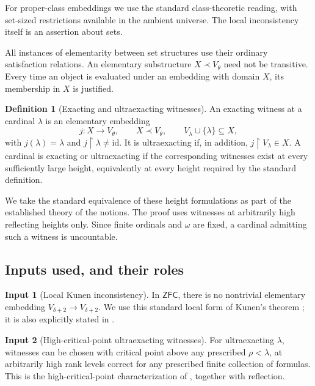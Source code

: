 \documentclass[11pt,letterpaper]{article}
\theoremstyle{definition}
\newtheorem{definition}{Definition}[section]
\newtheorem{inputthm}{Input}
\numberwithin{equation}{section}
\newcommand{\ZFC}{\mathsf{ZFC}}
\newcommand{\id}{\mathrm{id}}
\newcommand{\restr}{\mathbin{\upharpoonright}}
\begin{document}
For proper-class embeddings we use the standard class-theoretic reading, with set-sized restrictions available in the ambient universe. The local inconsistency itself is an assertion about sets.

All instances of elementarity between set structures use their ordinary satisfaction relations. An elementary substructure $X\prec V_\theta$ need not be transitive. Every time an object is evaluated under an embedding with domain $X$, its membership in $X$ is justified.

\begin{definition}[Exacting and ultraexacting witnesses]\label{def:uex}
An exacting witness at a cardinal $\lambda$ is an elementary embedding
\[
 j:X\longrightarrow V_\theta,
 \qquad X\prec V_\theta,
 \qquad V_\lambda\cup\{\lambda\}\subseteq X,
\]
with $j(\lambda)=\lambda$ and $j\restr\lambda\ne\id$. It is ultraexacting if, in addition, $j\restr V_\lambda\in X$. A cardinal is exacting or ultraexacting if the corresponding witnesses exist at every sufficiently large height, equivalently at every height required by the standard definition.
\end{definition}

We take the standard equivalence of these height formulations as part of the established theory of the notions. The proof uses witnesses at arbitrarily high reflecting heights only. Since finite ordinals and $\omega$ are fixed, a cardinal admitting such a witness is uncountable.

\subsection{Inputs used, and their roles}

\begin{inputthm}[Local Kunen inconsistency]\label{in:kunen}
In $\ZFC$, there is no nontrivial elementary embedding
$V_{\delta+2}\to V_{\delta+2}$. We use this standard local form of Kunen's theorem \cite{kunen}; it is also explicitly stated in \cite{schlutzenberg}.
\end{inputthm}

\begin{inputthm}[High-critical-point ultraexacting witnesses]\label{in:highcrit}
For ultraexacting $\lambda$, witnesses can be chosen with critical point above any prescribed $\rho<\lambda$, at arbitrarily high rank levels correct for any prescribed finite collection of formulas. This is the high-critical-point characterization of \cite[Proposition~2.4]{abgl}, together with reflection.
\end{inputthm}
\end{document}

